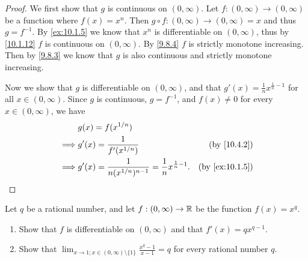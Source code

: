 \begin{proof}
  We first show that \(g\) is continuous on \((0, \infty)\).
  Let \(f : (0, \infty) \to (0, \infty)\) be a function where \(f(x) = x^n\).
  Then \(g \circ f : (0, \infty) \to (0, \infty) = x\) and thus \(g = f^{-1}\).
  By \cref{ex:10.1.5} we know that \(x^n\) is differentiable on \((0, \infty)\), thus by \cref{10.1.12} \(f\) is continuous on \((0, \infty)\).
  By \cref{9.8.4} \(f\) is strictly monotone increasing.
  Then by \cref{9.8.3} we know that \(g\) is also continuous and strictly monotone increasing.

  Now we show that \(g\) is differentiable on \((0, \infty)\), and that \(g'(x) = \frac{1}{n} x^{\frac{1}{n} - 1}\) for all \(x \in (0, \infty)\).
  Since \(g\) is continuous, \(g = f^{-1}\), and \(f(x) \neq 0\) for every \(x \in (0, \infty)\), we have
  \begin{align*}
             & g(x) = f(x^{1 / n})                                                                                       \\
    \implies & g'(x) = \frac{1}{f'(x^{1 / n})}                                            & \text{(by \cref{10.4.2})}    \\
    \implies & g'(x) = \frac{1}{n (x^{1 / n})^{n - 1}} = \frac{1}{n} x^{\frac{1}{n} - 1}. & \text{(by \cref{ex:10.1.5})}
  \end{align*}
\end{proof}

\begin{ex}\label{ex:10.4.2}
  Let \(q\) be a rational number, and let \(f : (0, \infty) \to \mathbb{R}\) be the function \(f(x) = x^q\).
  \begin{enumerate}
    \item Show that \(f\) is differentiable on \((0, \infty)\) and that \(f'(x) = q x^{q - 1}\).
    \item Show that \(\lim_{x \to 1 ; x \in (0, \infty) \setminus \{1\}} \frac{x^q - 1}{x - 1} = q\) for every rational number \(q\).
  \end{enumerate}
\end{ex}

